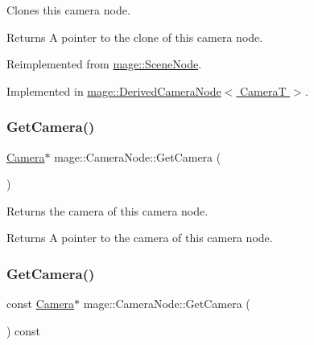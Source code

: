 Clones this camera node.

\begin{DoxyReturn}{Returns}
A pointer to the clone of this camera node. 
\end{DoxyReturn}


Reimplemented from \hyperlink{classmage_1_1_scene_node_a42d0d53ab804d38ebd584d2de6490eeb}{mage\+::\+Scene\+Node}.



Implemented in \hyperlink{classmage_1_1_derived_camera_node_aa965751029ebd6b41d3805b499a8304e}{mage\+::\+Derived\+Camera\+Node$<$ Camera\+T $>$}.

\hypertarget{classmage_1_1_camera_node_aa9887e3bf192d6c078aae2430732cbf8}{}\label{classmage_1_1_camera_node_aa9887e3bf192d6c078aae2430732cbf8} 
\subsubsection{\texorpdfstring{Get\+Camera()}{GetCamera()}\hspace{0.1cm}{\footnotesize\ttfamily [1/2]}}
{\footnotesize\ttfamily \hyperlink{classmage_1_1_camera}{Camera}$\ast$ mage\+::\+Camera\+Node\+::\+Get\+Camera (\begin{DoxyParamCaption}{ }\end{DoxyParamCaption})\hspace{0.3cm}{\ttfamily [noexcept]}}

Returns the camera of this camera node.

\begin{DoxyReturn}{Returns}
A pointer to the camera of this camera node. 
\end{DoxyReturn}
\hypertarget{classmage_1_1_camera_node_aa911263cfce8cec2a42c6d03d25af606}{}\label{classmage_1_1_camera_node_aa911263cfce8cec2a42c6d03d25af606} 
\subsubsection{\texorpdfstring{Get\+Camera()}{GetCamera()}\hspace{0.1cm}{\footnotesize\ttfamily [2/2]}}
{\footnotesize\ttfamily const \hyperlink{classmage_1_1_camera}{Camera}$\ast$ mage\+::\+Camera\+Node\+::\+Get\+Camera (\begin{DoxyParamCaption}{ }\end{DoxyParamCaption}) const\hspace{0.3cm}{\ttfamily [noexcept]}}

